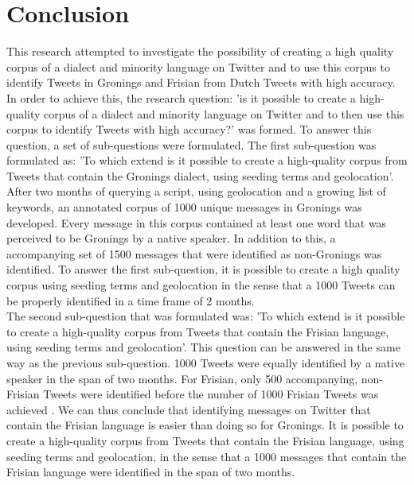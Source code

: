 \documentclass[
10pt, %
a4paper, %
oneside, %
headinclude,footinclude, %
] {book}%
\begin{document}
\chapter{Conclusion}
This research attempted to investigate the possibility of creating a high quality corpus of a dialect and minority language on Twitter and to use this corpus to identify Tweets in Gronings and Frisian from Dutch Tweets with high accuracy.
In order to achieve this, the research question: 'is it possible to create a high-quality corpus of a dialect and minority language on Twitter and to then use this corpus to identify Tweets with high accuracy?' was formed. To answer this question, a set of sub-questions were formulated. The first sub-question was formulated as: 'To which extend is it possible to create a high-quality corpus from Tweets that contain the Gronings dialect, using seeding terms and geolocation'. After two months of querying a script, using geolocation and a growing list of keywords, an annotated corpus of 1000 unique messages in Gronings was developed. Every message in this corpus contained at least one word that was perceived to be Gronings by a native speaker. In addition to this, a accompanying set of 1500 messages that were identified as non-Gronings was identified. To answer the first sub-question, it is possible to create a high quality corpus using seeding terms and geolocation in the sense that a 1000 Tweets can be properly identified in a time frame of 2 months. \\

The second sub-question that was formulated was: 'To which extend is it possible to create a high-quality corpus from Tweets that contain the Frisian language, using seeding terms and geolocation'. This question can be answered in the same way as the previous sub-question. 1000 Tweets were equally identified by a native speaker in the span of two months. For Frisian, only 500 accompanying, non-Frisian Tweets were identified before the number of 1000 Frisian Tweets was achieved . We can thus conclude that identifying messages on Twitter that contain the Frisian language is easier than doing so for Gronings. It is possible to create a high-quality corpus from Tweets that contain the Frisian language, using seeding terms and geolocation, in the sense that a 1000 messages that contain the Frisian language were identified in the span of two months. \\
\end{document}
